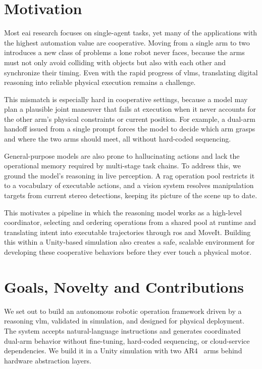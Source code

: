 \documentclass[
     12pt,
     a4paper,
     BCOR=10mm,
     DIV=14,
     listof=totoc,
     bibliography=totoc,
     parskip,
     twoside,
     headsepline
     ]{scrreprt}
\begin{document}
\section{Motivation}
Most \gls{eai} research focuses on single-agent tasks, yet many of the applications with the highest automation value are cooperative. Moving from a single arm to two introduces a new class of problems a lone robot never faces, because the arms must not only avoid colliding with objects but also with each other and synchronize their timing. Even with the rapid progress of \gls{vlm}s, translating digital reasoning into reliable physical execution remains a challenge.

This mismatch is especially hard in cooperative settings, because a model may plan a plausible joint maneuver that fails at execution when it never accounts for the other arm's physical constraints or current position. For example, a dual-arm handoff issued from a single prompt forces the model to decide which arm grasps and where the two arms should meet, all without hard-coded sequencing.

General-purpose models are also prone to hallucinating actions and lack the operational memory required by multi-stage task chains. To address this, we ground the model's reasoning in live perception. A \gls{rag} operation pool restricts it to a vocabulary of executable actions, and a vision system resolves manipulation targets from current stereo detections, keeping its picture of the scene up to date.

This motivates a pipeline in which the reasoning model works as a high-level coordinator, selecting and ordering operations from a shared pool at runtime and translating intent into executable trajectories through \gls{ros} and MoveIt. Building this within a Unity-based simulation also creates a safe, scalable environment for developing these cooperative behaviors before they ever touch a physical motor.

\section{Goals, Novelty and Contributions}\label{sec:goals}\label{sec:novelty}
We set out to build an autonomous robotic operation framework driven by a reasoning \gls{vlm}, validated in simulation, and designed for physical deployment. The system accepts natural-language instructions and generates coordinated dual-arm behavior without fine-tuning, hard-coded sequencing, or cloud-service dependencies. We build it in a Unity simulation with two AR4~\cite{AnninRobotics2026} arms behind hardware abstraction layers.
\end{document}
